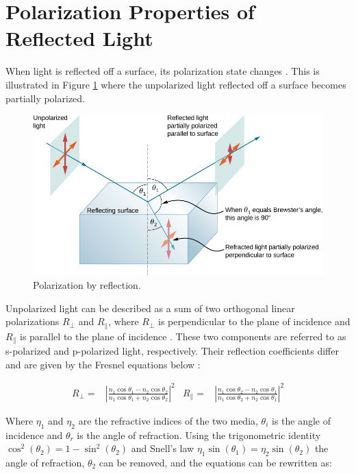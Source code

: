 \section{Polarization Properties of Reflected Light}
When light is reflected off a surface, its polarization state changes \cite[34]{lingUniversityPhysicsVolume2016}.
This is illustrated in Figure \ref{fig:polarized_reflection} where the unpolarized light reflected off a surface becomes partially polarized.


\begin{figure}[H]
    \centering
    \includegraphics[width=.8\linewidth]{figures/polarization/reflaction.png}
    \caption{Polarization by reflection. \cite[Figure 1.38]{lingUniversityPhysicsVolume2016}}
    \label{fig:polarized_reflection}
\end{figure}


Unpolarized light can be described as a sum of two orthogonal linear polarizations $R_\perp$ and $R_\parallel$, where $R_\perp$ is perpendicular to the plane of incidence and $R_\parallel$ is parallel to the plane of incidence  \cite{FresnelEquations2024}.
These two components are referred to as s-polarized and p-polarized light, respectively. Their reflection coefficients differ and are given by the Fresnel equations below \cite{FresnelEquations2024}:

\begin{align}
    R_\perp =         & \left|{\frac {n_{1}\cos \theta _1-n_{2}\cos \theta _2}{n_{1}\cos \theta _1+n_{2}\cos \theta _2}}\right|^{2}
                      &
    R_\parallel     = & \left|{\frac {n_{1}\cos \theta _2-n_{2}\cos \theta _1}{n_{1}\cos \theta _2+n_{2}\cos \theta _1}}\right|^{2}
\end{align}

Where  $\eta_1$ and $\eta_2$ are the refractive indices of the two media,
$\theta_i$ is the angle of incidence and $\theta_r$ is the angle of refraction.
Using the trigonometric identity $ \cos^2{\left(\theta_2 \right)} = 1- \sin^2{\left(\theta_2 \right)}$ and Snell's law $\eta_1 \sin{\left(\theta_1 \right)} = \eta_2 \sin{\left(\theta_2 \right)}$ the angle of refraction, $\theta_2$ can be removed, and the equations can be rewritten as:

